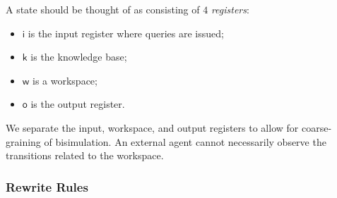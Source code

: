 A state should be thought of as consisting of $4$ \emph{registers}:
\begin{itemize}
  \item $\mathsf{i}$ is the input register where queries are issued;
  \item $\mathsf{k}$ is the knowledge base;
  \item $\mathsf{w}$ is a workspace;
  \item $\mathsf{o}$ is the output register.
\end{itemize}

We separate the input, workspace, and output registers to allow for
coarse-graining of bisimulation. An external agent cannot necessarily observe the transitions related to the workspace.

\subsubsection{Rewrite Rules}


